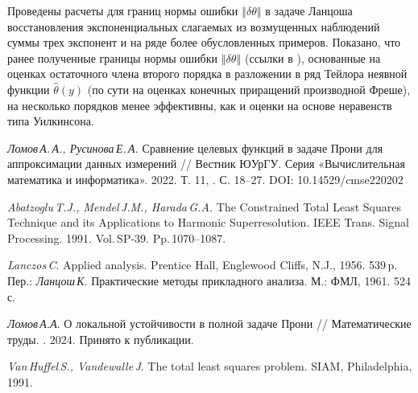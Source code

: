 Проведены расчеты для границ нормы ошибки
$\left\Vert \delta\theta\right\Vert $
в задаче Ланцоша восстановления экспоненциальных слагаемых из возмущенных наблюдений суммы трех экспонент \cite{Lanczos-1956} и на ряде более обусловленных примеров. Показано, что ранее полученные границы нормы
ошибки $\left\Vert \delta\theta\right\Vert $ (ссылки в \cite{Lomov--Rusinova-2022,Lomov-2024-MTrudy}),
основанные на оценках остаточного члена второго порядка в разложении в ряд Тейлора неявной функции $\hat{\theta}(y)$ (по сути на оценках конечных приращений производной Фреше), на несколько порядков менее эффективны, как и оценки на основе неравенств типа Уилкинсона.

%



\begin{thebibliography}{9} %
\emph{Ломов\,А.\,А., Русинова\,Е.\,А.}
Сравнение целевых функций в задаче Прони для аппроксимации данных
измерений // Вестник ЮУрГУ. Серия «Вычислительная математика и информатика».
2022. Т. 11, . С. 18--27. DOI: 10.14529/cmse220202

\emph{Abatzoglu\,T.J., Mendel\,J.M.,
Harada\,G.A.} The Constrained Total Least Squares Technique and its
Applications to Harmonic Superresolution. IEEE Trans. Signal Processing.
1991. Vol.\,SP-39. Pp.\emph{\,}1070--1087.

\emph{Lanczos\,C}. Applied analysis. Prentice
Hall, Englewood Cliffs, N.J., 1956. 539\,p. Пер.: \emph{Ланцош\,К}.
Практические методы прикладного анализа. М.: ФМЛ, 1961. 524\,с.

\emph{Ломов\,А.А}. О локальной устойчивости
в полной задаче Прони // Математические труды. . 2024. Принято к
публикации.

\emph{Van\,Huffel\,S., Vandewalle\,J}.
The total least squares problem. SIAM, Philadelphia, 1991.

\end{thebibliography}







%


